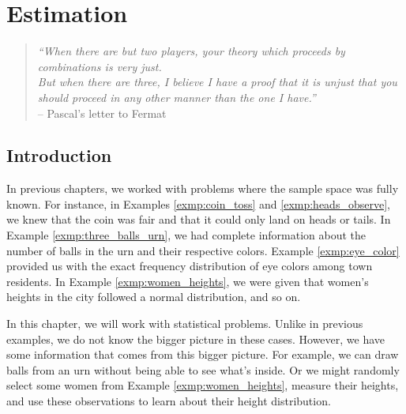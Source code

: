 


\chapter{Estimation}


\begin{verse}{\it
``When there are but two players, your theory which proceeds by combinations is very just. \\
But when there are three, I believe I have a proof that it is unjust that you should proceed in any other manner than the one I have.''\vspace*{6pt}} \\
\hspace*{2cm} -- Pascal's letter to Fermat
\end{verse}
\vspace*{12pt}


\section{Introduction}

In previous chapters, we worked with problems where the sample space was fully known.
For instance, in Examples \autoref{exmp:coin_toss} and \autoref{exmp:heads_observe}, we knew that the coin was fair and that it could only land on heads or tails.
In Example \autoref{exmp:three_balls_urn}, we had complete information about the number of balls in the urn and their respective colors.
Example \autoref{exmp:eye_color} provided us with the exact frequency distribution of eye colors among town residents.
In Example \autoref{exmp:women_heights}, we were given that women's heights in the city followed a normal distribution, and so on.

In this chapter, we will work with statistical problems.
Unlike in previous examples, we do not know the bigger picture in these cases.
However, we have some information that comes from this bigger picture.
For example, we can draw balls from an urn without being able to see what's inside.
Or we might randomly select some women from Example \autoref{exmp:women_heights}, measure their heights, and use these observations to learn about their height distribution.

